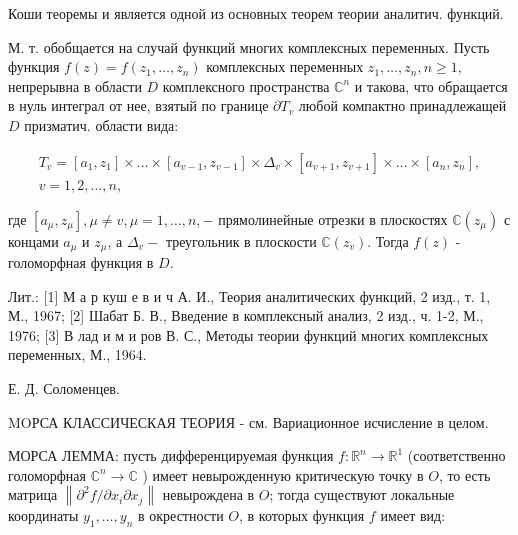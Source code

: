 \documentclass[10pt]{article}
\begin{document}
Коши теоремы и является одной из основных теорем теории аналитич. функций.



М. т. обобщается на случай функций многих комплексных переменных. Пусть функция $f(z)=f\left(z_{1}, \ldots, z_{n}\right)$ комплексных переменных $z_{1}, \ldots, z_{n}, n \geqslant 1$, непрерывна в области $D$ комплексного пространства $\mathbb{C}^{n}$ и такова, что обращается в нуль интеграл от нее, взятый по границе $\partial T_{v}$ любой компактно принадлежащей $D$ призматич. области вида:



\[

\begin{gathered}

T_{v}=\left[a_{1}, z_{1}\right] \times \ldots \times\left[a_{v-1}, z_{v-1}\right] \times \Delta_{v} \times\left[a_{v+1}, z_{v+1}\right] \times \ldots \times\left[a_{n}, z_{n}\right], \\

v=1,2, \ldots, n,

\end{gathered}

\]



где $\left[a_{\mu}, z_{\mu}\right], \mu \neq v, \mu=1, \ldots, n,-$ прямолинейные отрезки в плоскостях $\mathbb{C}\left(z_{\mu}\right)$ с концами $a_{\mu}$ и $z_{\mu}$, а $\Delta_{v}-$ треугольник в плоскости $\mathbb{C}\left(z_{v}\right)$. Тогда $f(z)$ - голоморфная функция в $D$.



Лит.: [1] М а р куш е в и ч А. И., Теория аналитических функций, 2 изд., т. 1, М., 1967; [2] Шабат Б. В., Введение в комплексный анализ, 2 изд., ч. 1-2, М., 1976; [3] В лад и м и ров В. С., Методы теории функций многих комплексных переменных, М., 1964.



Е. Д. Соломенцев.



MOРСА КЛАССИЧЕСКАЯ ТЕОРИЯ - см. Вариационное исчисление в целом.



МОРСА ЛЕММА: пусть дифференцируемая функция $f: \mathbb{R}^{n} \rightarrow \mathbb{R}^{1}$ (соответственно голоморфная $\mathbb{C}^{n} \rightarrow \mathbb{C}$ ) имеет невырожденную критическую точку в $O$, то есть матрица $\left\|\partial^{2} f / \partial x_{i} \partial x_{j}\right\|$ невырождена в $O$; тогда существуют локальные координаты $y_{1}, \ldots, y_{n}$ в окрестности $O$, в которых функция $f$ имеет вид:
\end{document}
